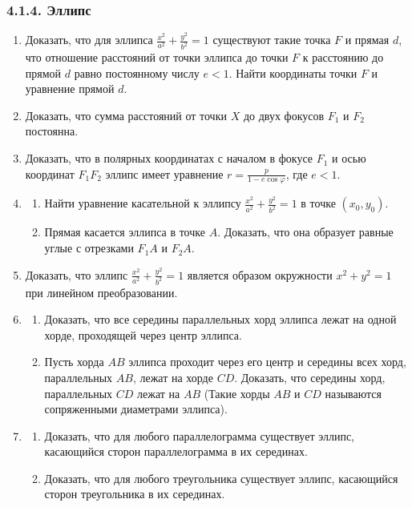 \subsubsection*{4.1.4. Эллипс}

\begin{enumerate}

	\item Доказать, что для эллипса $\frac{x^2}{a^2} + \frac{y^2}{b^2} = 1$ существуют такие точка $F$ и прямая $d$, что отношение расстояний от точки эллипса до точки $F$ к расстоянию до прямой $d$ равно постоянному числу $e < 1$. Найти координаты точки $F$ и уравнение прямой $d$.

	\item Доказать, что сумма расстояний от точки $X$ до двух фокусов $F_1$ и $F_2$ постоянна.

	\item Доказать, что в полярных координатах с началом в фокусе $F_1$ и осью координат $F_1 F_2$ эллипс имеет уравнение $r = \frac{p}{1 - e\cos\varphi}$, где $e < 1$.

	\item
	\begin{enumerate}
		\item Найти уравнение касательной к эллипсу $\frac{x^2}{a^2} + \frac{y^2}{b^2} = 1$ в точке $(x_0, y_0)$.
		\item Прямая касается эллипса в точке $A$. Доказать, что она образует равные углые с отрезками $F_1A$ и $F_2A$.
	\end{enumerate}

	\item Доказать, что эллипс $\frac{x^2}{a^2} + \frac{y^2}{b^2} = 1$ является образом окружности $x^2 + y^2 = 1$ при линейном преобразовании.

	\item
	\begin{enumerate}
		\item Доказать, что все середины параллельных хорд эллипса лежат на одной хорде, проходящей через центр эллипса.
		\item Пусть хорда $AB$ эллипса проходит через его центр и середины всех хорд, параллельных $AB$, лежат на хорде $CD$. Доказать, что середины хорд, параллельных $CD$ лежат на $AB$ (Такие хорды $AB$ и $CD$ называются сопряженными диаметрами эллипса).
	\end{enumerate}

	\item
	\begin{enumerate}
		\item Доказать, что для любого параллелограмма существует эллипс, касающийся сторон параллелограмма в их серединах.
		\item Доказать, что для любого треугольника существует эллипс, касающийся сторон треугольника в их серединах.
	\end{enumerate}


\end{enumerate}
